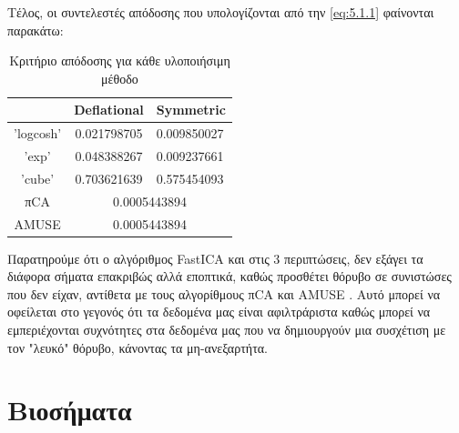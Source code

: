 \noindent Τέλος, οι συντελεστές απόδοσης που υπολογίζονται από την \eqref{eq:5.1.1} φαίνονται παρακάτω: \en
\begin{table}[H] 
\centering
\begin{tabular}{|c|c|l|} 
\hline
          & Deflational  & Symmetric  \\ \hline
'logcosh' & 0.021798705 &  0.009850027 \\ \hline
'exp'     & 0.048388267 &  0.009237661 \\ \hline
'cube'    & 0.703621639 &  0.575454093 \\ \hline
πCA       & \multicolumn{2}{c|}{0.0005443894} \\ \hline
AMUSE     & \multicolumn{2}{c|}{0.0005443894} \\ \hline
\end{tabular}
\gr
\caption{Κριτήριο απόδοσης για κάθε υλοποιήσιμη μέθοδο}
\label{table:5.2}
\end{table}
\newpage
\noindent Παρατηρούμε ότι ο αλγόριθμος \en FastICA \gr και στις 3 περιπτώσεις, δεν εξάγει τα διάφορα σήματα επακριβώς αλλά εποπτικά, καθώς προσθέτει θόρυβο σε συνιστώσες που δεν είχαν, αντίθετα με τους αλγορίθμους π\en CA \gr και \en AMUSE \gr . Αυτό μπορεί να οφείλεται στο γεγονός ότι τα δεδομένα μας είναι αφιλτράριστα καθώς μπορεί να εμπεριέχονται συχνότητες στα δεδομένα μας που να δημιουργούν μια συσχέτιση με τον "λευκό" θόρυβο, κάνοντας τα μη-ανεξαρτήτα.
\section{Βιοσήματα}
\justifying

